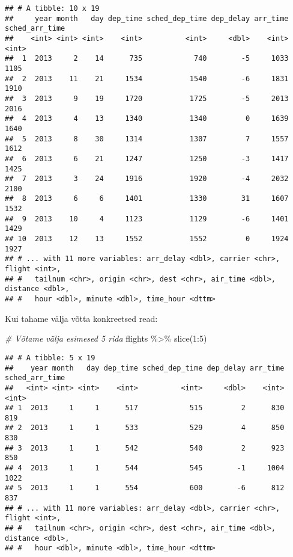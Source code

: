 \documentclass[
]{book}
\newenvironment{Shaded}{\begin{snugshade}}{\end{snugshade}}
\newcommand{\CommentTok}[1]{\textcolor[rgb]{0.56,0.35,0.01}{\textit{#1}}}
\newcommand{\DecValTok}[1]{\textcolor[rgb]{0.00,0.00,0.81}{#1}}
\newcommand{\FunctionTok}[1]{\textcolor[rgb]{0.00,0.00,0.00}{#1}}
\newcommand{\NormalTok}[1]{#1}
\newcommand{\SpecialCharTok}[1]{\textcolor[rgb]{0.00,0.00,0.00}{#1}}
\begin{document}
\begin{verbatim}
## # A tibble: 10 x 19
##     year month   day dep_time sched_dep_time dep_delay arr_time sched_arr_time
##    <int> <int> <int>    <int>          <int>     <dbl>    <int>          <int>
##  1  2013     2    14      735            740        -5     1033           1105
##  2  2013    11    21     1534           1540        -6     1831           1910
##  3  2013     9    19     1720           1725        -5     2013           2016
##  4  2013     4    13     1340           1340         0     1639           1640
##  5  2013     8    30     1314           1307         7     1557           1612
##  6  2013     6    21     1247           1250        -3     1417           1425
##  7  2013     3    24     1916           1920        -4     2032           2100
##  8  2013     6     6     1401           1330        31     1607           1532
##  9  2013    10     4     1123           1129        -6     1401           1429
## 10  2013    12    13     1552           1552         0     1924           1927
## # ... with 11 more variables: arr_delay <dbl>, carrier <chr>, flight <int>,
## #   tailnum <chr>, origin <chr>, dest <chr>, air_time <dbl>, distance <dbl>,
## #   hour <dbl>, minute <dbl>, time_hour <dttm>
\end{verbatim}

Kui tahame välja võtta konkreetsed read:

\begin{Shaded}
\begin{Highlighting}[]
\CommentTok{\# Võtame välja esimesed 5 rida}
\NormalTok{flights }\SpecialCharTok{\%\textgreater{}\%} 
  \FunctionTok{slice}\NormalTok{(}\DecValTok{1}\SpecialCharTok{:}\DecValTok{5}\NormalTok{)}
\end{Highlighting}
\end{Shaded}

\begin{verbatim}
## # A tibble: 5 x 19
##    year month   day dep_time sched_dep_time dep_delay arr_time sched_arr_time
##   <int> <int> <int>    <int>          <int>     <dbl>    <int>          <int>
## 1  2013     1     1      517            515         2      830            819
## 2  2013     1     1      533            529         4      850            830
## 3  2013     1     1      542            540         2      923            850
## 4  2013     1     1      544            545        -1     1004           1022
## 5  2013     1     1      554            600        -6      812            837
## # ... with 11 more variables: arr_delay <dbl>, carrier <chr>, flight <int>,
## #   tailnum <chr>, origin <chr>, dest <chr>, air_time <dbl>, distance <dbl>,
## #   hour <dbl>, minute <dbl>, time_hour <dttm>
\end{verbatim}
\end{document}
